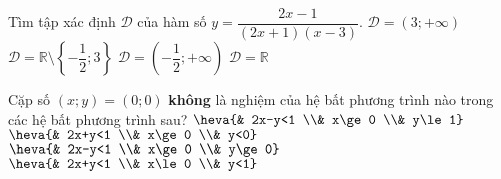 \begin{ex}%
Tìm tập xác định $\mathscr{D}$ của hàm số $y=\dfrac{2x-1}{(2x+1)(x-3)}$.
\choice
{$\mathscr{D}=(3;+\infty)$}
{\True $\mathscr{D}=\mathbb{R}\setminus\left\{-\dfrac{1}{2};3\right\}$}
{$\mathscr{D}=\left(-\dfrac{1}{2};+\infty\right)$}
{$\mathscr{D}=\mathbb{R}$}
\end{ex}

\begin{ex}%
Cặp số $(x;y)=(0;0)$ \textbf{không} là nghiệm của hệ bất phương trình nào trong các hệ bất phương trình sau?
\def\dotEX{}
\choice
{$\heva{& 2x-y<1 \\& x\ge 0 \\& y\le 1}$}
{\True $\heva{& 2x+y<1 \\& x\ge 0 \\& y<0}$}
{$\heva{& 2x-y<1 \\& x\ge 0 \\& y\ge 0}$}
{$\heva{& 2x+y<1 \\& x\le 0 \\& y<1}$}
\end{ex}

